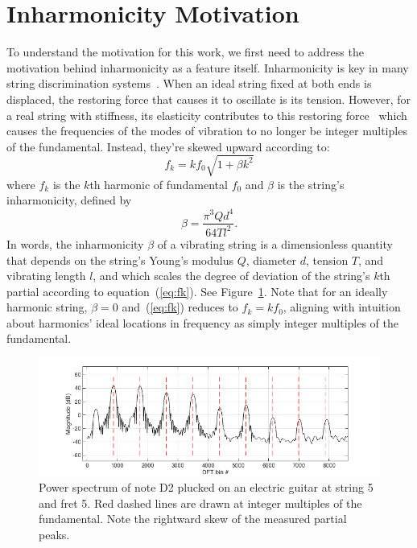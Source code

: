\documentclass[12pt]{cmuthesis}
\begin{document}
\section{Inharmonicity Motivation}
To understand the motivation for this work, we first need to address the motivation behind inharmonicity as a feature itself. Inharmonicity is key in many string discrimination systems~\cite{barbancho2009,barbanchoi2012,abesser2012,dittmar2013,kehling2014}. When an ideal string fixed at both ends is displaced, the restoring force that causes it to oscillate is its tension. However, for a real string with stiffness, its elasticity contributes to this restoring force~\cite{fletcher1962} which causes the frequencies of the modes of vibration to no longer be integer multiples of the fundamental. Instead, they're skewed upward according to: 
\begin{equation}
\label{eq:fk}
f_k = kf_{0}\sqrt{1+\beta k^2}
\end{equation}
where $f_k$ is the $k$th harmonic of fundamental $f_0$ and $\beta$ is the string's inharmonicity, defined by
\begin{equation}
\beta = \frac{\pi^3 Q d^4}{64 T l^2}. \label{eq:beta}
\end{equation}
In words, the inharmonicity $\beta$ of a vibrating string is a dimensionless quantity that depends on the string's Young's modulus $Q$, diameter $d$, tension $T$, and vibrating length $l$, and which scales the degree of deviation of the string's $k$th partial according to equation~(\ref{eq:fk}). See Figure~\ref{fig:skew}. Note that for an ideally harmonic string, $\beta = 0$ and~(\ref{eq:fk}) reduces to $f_k = kf_0$, aligning with intuition about harmonics' ideal locations in frequency as simply integer multiples of the fundamental.

\begin{figure}[!htbp]
\centering
\includegraphics[scale=0.65]{skew}
\caption{Power spectrum of note D2 plucked on an electric guitar at string 5 and fret 5. Red dashed lines are drawn at integer multiples of the fundamental. Note the rightward skew of the measured partial peaks.}
\label{fig:skew}
\end{figure}
\end{document}
